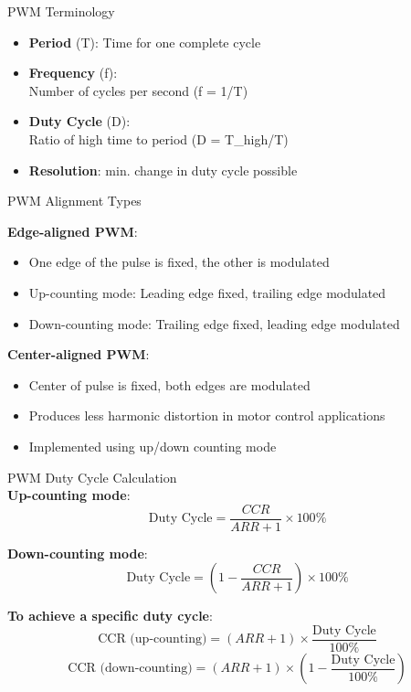 \begin{theorem}{PWM Terminology}
\begin{itemize}
    \item \textbf{Period} (T): Time for one complete cycle
    \item \textbf{Frequency} (f): \\ Number of cycles per second (f = 1/T)
    \item \textbf{Duty Cycle} (D): \\ Ratio of high time to period (D = T\_{high}/T)
    \item \textbf{Resolution}: min. change in duty cycle possible
\end{itemize}
\end{theorem}


\begin{concept}{PWM Alignment Types}

\textbf{Edge-aligned PWM}:
    \begin{itemize}
        \item One edge of the pulse is fixed, the other is modulated
        \item Up-counting mode: Leading edge fixed, trailing edge modulated
        \item Down-counting mode: Trailing edge fixed, leading edge modulated
    \end{itemize}
\textbf{Center-aligned PWM}:
    \begin{itemize}
        \item Center of pulse is fixed, both edges are modulated
        \item Produces less harmonic distortion in motor control applications
        \item Implemented using up/down counting mode
    \end{itemize}
\end{concept}


\begin{corollary}{PWM Duty Cycle Calculation}\\
\textbf{Up-counting mode}:
$$
\text{Duty Cycle} = \frac{CCR}{ARR+1} \times 100\%
$$

\textbf{Down-counting mode}:
$$
\text{Duty Cycle} = \left(1 - \frac{CCR}{ARR+1}\right) \times 100\%
$$

\textbf{To achieve a specific duty cycle}:
$$
\text{CCR (up-counting)} = (ARR+1) \times \frac{\text{Duty Cycle}}{100\%} 
$$
$$
\text{CCR (down-counting)} = (ARR+1) \times (1 - \frac{\text{Duty Cycle}}{100\%})
$$
\end{corollary}

